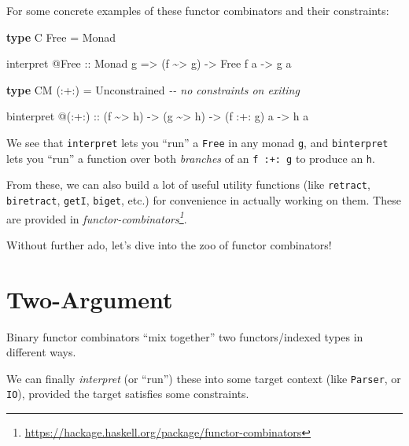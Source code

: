 \documentclass[]{article}
\newenvironment{Shaded}{}{}
\newcommand{\CommentTok}[1]{\textcolor[rgb]{0.38,0.63,0.69}{\textit{#1}}}
\newcommand{\DataTypeTok}[1]{\textcolor[rgb]{0.56,0.13,0.00}{#1}}
\newcommand{\KeywordTok}[1]{\textcolor[rgb]{0.00,0.44,0.13}{\textbf{#1}}}
\newcommand{\NormalTok}[1]{#1}
\newcommand{\OperatorTok}[1]{\textcolor[rgb]{0.40,0.40,0.40}{#1}}
\newcommand{\OtherTok}[1]{\textcolor[rgb]{0.00,0.44,0.13}{#1}}
\renewcommand{\href}[2]{#2\footnote{\url{#1}}}
\begin{document}
For some concrete examples of these functor combinators and their constraints:

\begin{Shaded}
\begin{Highlighting}[]
\KeywordTok{type} \DataTypeTok{C} \DataTypeTok{Free} \OtherTok{=} \DataTypeTok{Monad}

\NormalTok{interpret }\OperatorTok{@}\DataTypeTok{Free}
\OtherTok{    ::} \DataTypeTok{Monad}\NormalTok{ g}
    \OtherTok{=>}\NormalTok{ (f }\OperatorTok{\textasciitilde{}>}\NormalTok{ g)}
    \OtherTok{{-}>} \DataTypeTok{Free}\NormalTok{ f a}
    \OtherTok{{-}>}\NormalTok{ g a}

\KeywordTok{type} \DataTypeTok{CM}\NormalTok{ (}\OperatorTok{:+:}\NormalTok{) }\OtherTok{=} \DataTypeTok{Unconstrained}   \CommentTok{{-}{-} no constraints on exiting}

\NormalTok{binterpret }\OperatorTok{@}\NormalTok{(}\OperatorTok{:+:}\NormalTok{)}
\OtherTok{    ::}\NormalTok{ (f }\OperatorTok{\textasciitilde{}>}\NormalTok{ h)}
    \OtherTok{{-}>}\NormalTok{ (g }\OperatorTok{\textasciitilde{}>}\NormalTok{ h)}
    \OtherTok{{-}>}\NormalTok{ (f }\OperatorTok{:+:}\NormalTok{ g) a}
    \OtherTok{{-}>}\NormalTok{ h a}
\end{Highlighting}
\end{Shaded}

We see that \texttt{interpret} lets you ``run'' a \texttt{Free} in any monad
\texttt{g}, and \texttt{binterpret} lets you ``run'' a function over both
\emph{branches} of an \texttt{f\ :+:\ g} to produce an \texttt{h}.

From these, we can also build a lot of useful utility functions (like
\texttt{retract}, \texttt{biretract}, \texttt{getI}, \texttt{biget}, etc.) for
convenience in actually working on them. These are provided in
\emph{\href{https://hackage.haskell.org/package/functor-combinators}{functor-combinators}}.

Without further ado, let's dive into the zoo of functor combinators!

\hypertarget{two-argument}{%
\section{Two-Argument}\label{two-argument}}

Binary functor combinators ``mix together'' two functors/indexed types in
different ways.

We can finally \emph{interpret} (or ``run'') these into some target context
(like \texttt{Parser}, or \texttt{IO}), provided the target satisfies some
constraints.
\end{document}
